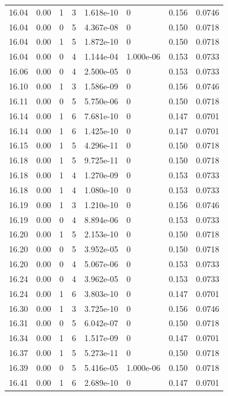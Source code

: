\documentclass[preview]{standalone}
\begin{document}
{{{{{{{{{{{{{{{{\begin{tabular}{L{1.2cm}C{1.2cm} C{0.3cm}C{0.5cm} C{1.4cm}C{1.4cm} C{1.4cm}C{1.4cm}}
  16.04  &  0.00  & 1     &  3 &  1.618e-10  & 0  & 0.156 &  0.0746   \\ 
  16.04  &  0.00  & 0     &  5 &  4.367e-08  & 0  & 0.150 &  0.0718   \\ 
  16.04  &  0.00  & 1     &  5 &  1.872e-10  & 0  & 0.150 &  0.0718   \\ 
  16.04  &  0.00  & 0     &  4 &  1.144e-04  & 1.000e-06  & 0.153 &  0.0733   \\ 
  16.06  &  0.00  & 0     &  4 &  2.500e-05  & 0  & 0.153 &  0.0733   \\ 
  16.10  &  0.00  & 1     &  3 &  1.586e-09  & 0  & 0.156 &  0.0746   \\ 
  16.11  &  0.00  & 0     &  5 &  5.750e-06  & 0  & 0.150 &  0.0718   \\ 
  16.14  &  0.00  & 1     &  6 &  7.681e-10  & 0  & 0.147 &  0.0701   \\ 
  16.14  &  0.00  & 1     &  6 &  1.425e-10  & 0  & 0.147 &  0.0701   \\ 
  16.15  &  0.00  & 1     &  5 &  4.296e-11  & 0  & 0.150 &  0.0718   \\ 
  16.18  &  0.00  & 1     &  5 &  9.725e-11  & 0  & 0.150 &  0.0718   \\ 
  16.18  &  0.00  & 1     &  4 &  1.270e-09  & 0  & 0.153 &  0.0733   \\ 
  16.18  &  0.00  & 1     &  4 &  1.080e-10  & 0  & 0.153 &  0.0733   \\ 
  16.19  &  0.00  & 1     &  3 &  1.210e-10  & 0  & 0.156 &  0.0746   \\ 
  16.19  &  0.00  & 0     &  4 &  8.894e-06  & 0  & 0.153 &  0.0733   \\ 
  16.20  &  0.00  & 1     &  5 &  2.153e-10  & 0  & 0.150 &  0.0718   \\ 
  16.20  &  0.00  & 0     &  5 &  3.952e-05  & 0  & 0.150 &  0.0718   \\ 
  16.20  &  0.00  & 0     &  4 &  5.067e-06  & 0  & 0.153 &  0.0733   \\ 
  16.24  &  0.00  & 0     &  4 &  3.962e-05  & 0  & 0.153 &  0.0733   \\ 
  16.24  &  0.00  & 1     &  6 &  3.803e-10  & 0  & 0.147 &  0.0701   \\ 
  16.30  &  0.00  & 1     &  3 &  3.725e-10  & 0  & 0.156 &  0.0746   \\ 
  16.31  &  0.00  & 0     &  5 &  6.042e-07  & 0  & 0.150 &  0.0718   \\ 
  16.34  &  0.00  & 1     &  6 &  1.517e-09  & 0  & 0.147 &  0.0701   \\ 
  16.37  &  0.00  & 1     &  5 &  5.273e-11  & 0  & 0.150 &  0.0718   \\ 
  16.39  &  0.00  & 0     &  5 &  5.416e-05  & 1.000e-06  & 0.150 &  0.0718   \\ 
  16.41  &  0.00  & 1     &  6 &  2.689e-10  & 0  & 0.147 &  0.0701   \\ 
\hline 
\end{tabular} 

}}}}}}}}}}}}}}}}
\end{document}
